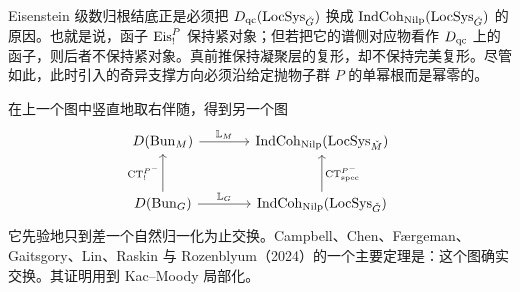 \begin{remark}
Eisenstein 级数归根结底正是必须把 $D_{\mathrm{qc}}(\operatorname{LocSys}_{\check{G}})$ 换成 $\operatorname{IndCoh}_{\mathrm{Nilp}}(\operatorname{LocSys}_{\check{G}})$ 的原因。也就是说，函子 $\operatorname{Eis}^{P}_{!}$ 保持紧对象；但若把它的谱侧对应物看作 $D_{\mathrm{qc}}$ 上的函子，则后者不保持紧对象。真前推保持凝聚层的复形，却不保持完美复形。尽管如此，此时引入的奇异支撑方向必须沿给定抛物子群 $P$ 的单幂根而是幂零的。
\end{remark}

在上一个图中竖直地取右伴随，得到另一个图
\[
\begin{tikzcd}[column sep=large,row sep=large]
D(\Bun_M) \arrow[r,"\mathbb{L}_M"] & \IndCoh_{\Nilp}(\LocSys_{\Md}) \\
D(\Bun_G) \arrow[r,"\mathbb{L}_G"] \arrow[u,"\CT^{P^{-}}_{!}"] & \IndCoh_{\Nilp}(\LocSys_{\Gd}) \arrow[u,"\CT^{P^{-}}_{\mathrm{spec}}"']
\end{tikzcd}
\]
它先验地只到差一个自然归一化为止交换。Campbell、Chen、Færgeman、Gaitsgory、Lin、Raskin 与 Rozenblyum（2024）的一个主要定理是：这个图确实交换。其证明用到 Kac--Moody 局部化。
